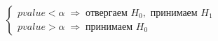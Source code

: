 \begin{rulee}\label{cha:basic/section:stat/subsection:hyp/rule:2}
	$$\begin{cases}
		pvalue < \alpha \; \Rightarrow \; \text{отвергаем } H_0, \text{ принимаем } H_1 \\
		pvalue > \alpha \; \Rightarrow \; \text{принимаем } H_0
	\end{cases}$$
\end{rulee}






























